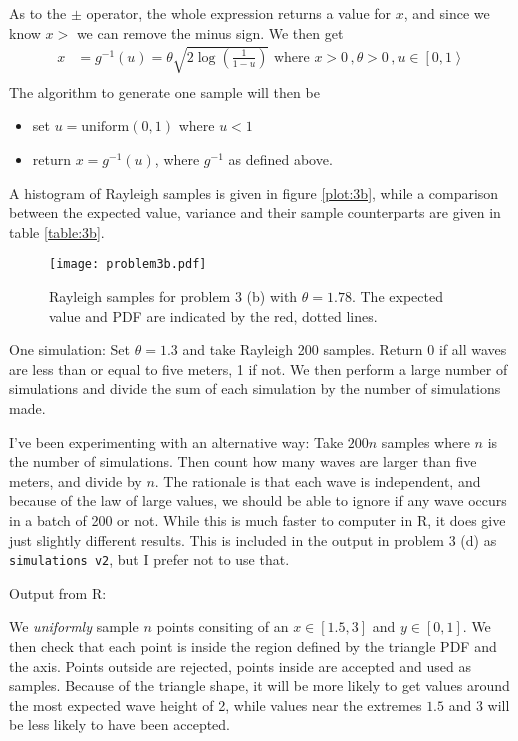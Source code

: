 \documentclass[a4paper,english,12pt]{article}
\begin{document}
As to the $\pm$ operator, the whole expression returns a value for $x$, and
since we know $x>$ we can remove the minus sign. We then get
\begin{align*}
    x &= g^{-1}(u) = \theta\sqrt{2\log{\left(\frac{1}{1 - u}\right)}}
   \text{ where } x>0\, , \theta>0\, , u \in \left[0,1\right>
   \\
\end{align*}%
The algorithm to generate one sample will then be
\begin{itemize}
  \item set $u = \mathrm{uniform}(0,1)$ where $u<1$
  \item return $x = g^{-1}(u)$, where $g^{-1}$ as defined above.
\end{itemize}

A histogram of Rayleigh samples is given in figure \vref{plot:3b}, while a
comparison between the expected value, variance and their sample counterparts
are given in table \vref{table:3b}.



\begin{figure}
  \centering
  \texttt{[image: problem3b.pdf]}
  \caption{Rayleigh samples for problem 3 (b) with $\theta=1.78$. The expected
  value and PDF are indicated by the red, dotted lines.}
  \label{plot:3b}
\end{figure}

One simulation: Set $\theta=1.3$ and take Rayleigh 200 samples. Return 0 if all
waves are less than or equal to five meters, 1 if not. We then perform a large
number of simulations and divide the sum of each simulation by the number of
simulations made.

I've been experimenting with an alternative way: Take $200n$ samples where $n$
is the number of simulations. Then count how many waves are larger than five
meters, and divide by $n$. The rationale is that each wave is independent, and
because of the law of large values, we should be able to ignore if any wave
occurs in a batch of 200 or not. While this is much faster to computer in R, it
does give just slightly different results. This is included in the output in
problem 3 (d) as \texttt{simulations v2}, but I prefer not to use that.

Output from R:

We \textit{uniformly} sample $n$ points consiting of an $x \in [1.5, 3]$ and $y
\in [0, 1]$. We then check that each point is inside the region defined by the
triangle PDF and the axis. Points outside are rejected, points inside are
accepted and used as samples.  Because of the triangle shape, it will be more
likely to get values around the most expected wave height of 2, while values
near the extremes $1.5$ and $3$ will be less likely to have been accepted.
\end{document}
